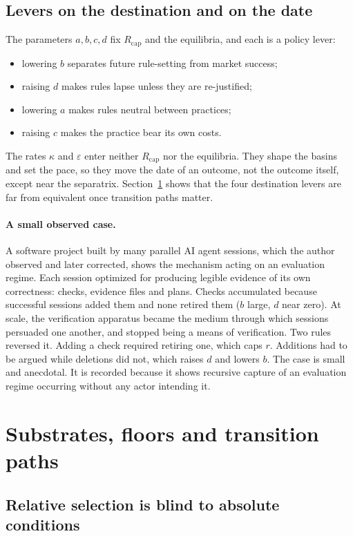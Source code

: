 \documentclass[11pt]{article}
\theoremstyle{plain}
\theoremstyle{definition}
\newcommand{\Rcap}{R_{\mathrm{cap}}}
\begin{document}
\subsection{Levers on the destination and on the date}

The parameters $a,b,c,d$ fix $\Rcap$ and the equilibria, and each is a policy lever:
\begin{itemize}[leftmargin=*]
\item lowering $b$ separates future rule-setting from market success;
\item raising $d$ makes rules lapse unless they are re-justified;
\item lowering $a$ makes rules neutral between practices;
\item raising $c$ makes the practice bear its own costs.
\end{itemize}
The rates $\kappa$ and $\varepsilon$ enter neither $\Rcap$ nor the equilibria. They shape the basins and set the pace, so they move the date of an outcome, not the outcome itself, except near the separatrix. Section~\ref{sec:substrate} shows that the four destination levers are far from equivalent once transition paths matter.

\paragraph{A small observed case.} A software project built by many parallel AI agent sessions, which the author observed and later corrected, shows the mechanism acting on an evaluation regime. Each session optimized for producing legible evidence of its own correctness: checks, evidence files and plans. Checks accumulated because successful sessions added them and none retired them ($b$ large, $d$ near zero). At scale, the verification apparatus became the medium through which sessions persuaded one another, and stopped being a means of verification. Two rules reversed it. Adding a check required retiring one, which caps $r$. Additions had to be argued while deletions did not, which raises $d$ and lowers $b$. The case is small and anecdotal. It is recorded because it shows recursive capture of an evaluation regime occurring without any actor intending it.

\section{Substrates, floors and transition paths}\label{sec:substrate}

\subsection{Relative selection is blind to absolute conditions}
\end{document}
